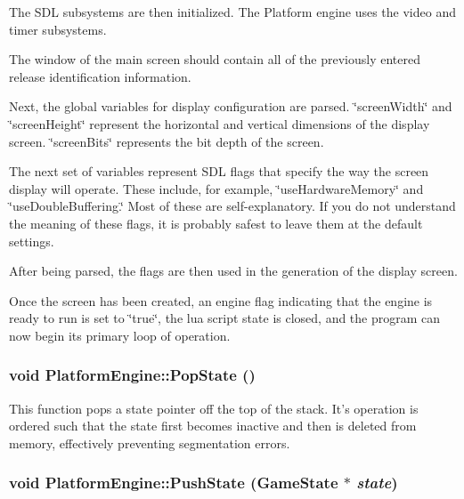 The SDL subsystems are then initialized. The Platform engine uses the video and timer subsystems.

The window of the main screen should contain all of the previously entered release identification information.

Next, the global variables for display configuration are parsed. \char`\"{}screenWidth\char`\"{} and \char`\"{}screenHeight\char`\"{} represent the horizontal and vertical dimensions of the display screen. \char`\"{}screenBits\char`\"{} represents the bit depth of the screen.

The next set of variables represent SDL flags that specify the way the screen display will operate. These include, for example, \char`\"{}useHardwareMemory\char`\"{} and \char`\"{}useDoubleBuffering.\char`\"{} Most of these are self-explanatory. If you do not understand the meaning of these flags, it is probably safest to leave them at the default settings.

After being parsed, the flags are then used in the generation of the display screen.

Once the screen has been created, an engine flag indicating that the engine is ready to run is set to \char`\"{}true\char`\"{}, the lua script state is closed, and the program can now begin its primary loop of operation.\hypertarget{class_platform_engine_cf001abec596906465197d1220db2230}{
\subsubsection[{PopState}]{\setlength{\rightskip}{0pt plus 5cm}void PlatformEngine::PopState ()}}
\label{db/da1/class_platform_engine_cf001abec596906465197d1220db2230}


This function pops a state pointer off the top of the stack. It's operation is ordered such that the state first becomes inactive and then is deleted from memory, effectively preventing segmentation errors. \hypertarget{class_platform_engine_98e3d34b6ee831bcc1d26bac83bfe8d8}{
\subsubsection[{PushState}]{\setlength{\rightskip}{0pt plus 5cm}void PlatformEngine::PushState ({\bf GameState} $\ast$ {\em state})}}
\label{db/da1/class_platform_engine_98e3d34b6ee831bcc1d26bac83bfe8d8}


